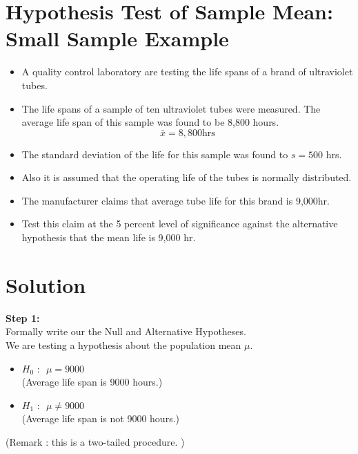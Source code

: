 \documentclass[]{report}
\begin{document}

\section*{Hypothesis Test of Sample Mean: Small Sample Example}

\begin{itemize}
\item A quality control laboratory are testing the life spans of a brand of ultraviolet tubes.
\item The life spans of a sample of ten ultraviolet tubes were measured. The average life span of this sample was found to be 8,800 hours.
\[\bar{x} = 8,800 \mbox{hrs} \]
\item The standard deviation of the life for this sample was found to $s = 500$ hrs.
\item Also it is assumed that the operating life of the tubes is normally distributed. 


\item The manufacturer claims that average tube life for this brand
is 9,000hr. \item Test this claim at the 5 percent level of significance against the alternative hypothesis
that the mean life is 9,000 hr.
\end{itemize}
\section*{Solution}
\noindent \textbf{Step 1:} \\ Formally write our the Null and Alternative Hypotheses.\\
We are testing a hypothesis about the population mean $\mu$.

\begin{itemize}
\item $H_0 \mbox{ : } $ $\mu = 9000$ \\ (Average life span is 9000 hours.)\bigskip
\item $H_1 \mbox{ : } $ $\mu \neq 9000$\\ (Average life span is not 9000 hours.)
\end{itemize}
\bigskip
(Remark : this is a two-tailed procedure.
)



\end{document}
